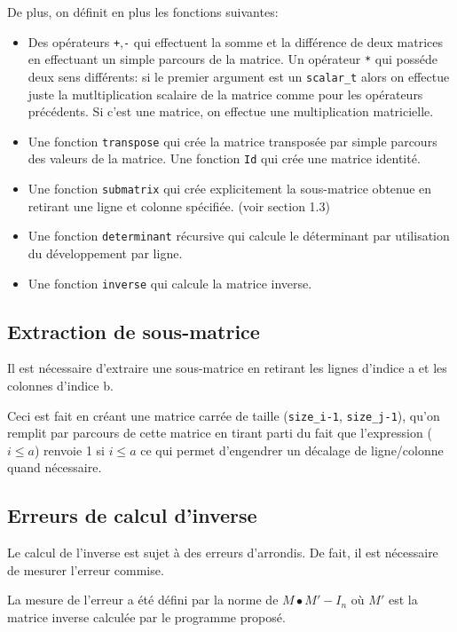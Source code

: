 \documentclass[a4paper,11pt]{article}
\begin{document}
De plus, on définit en plus les fonctions suivantes:

\begin{itemize}
\item Des opérateurs \texttt{+},\texttt{-} qui effectuent la somme et la différence de deux matrices en effectuant un simple parcours de la matrice. Un opérateur \texttt{*} qui posséde deux sens différents: si le premier argument est un \texttt{scalar\_t} alors on effectue juste la mutltiplication scalaire de la matrice comme pour les opérateurs précédents. Si c'est une matrice, on effectue une multiplication matricielle.
\item Une fonction \texttt{transpose} qui crée la matrice transposée par simple parcours des valeurs de la matrice. Une fonction \texttt{Id} qui crée une matrice identité.
\item Une fonction \texttt{submatrix} qui crée explicitement la sous-matrice obtenue en retirant une ligne et colonne spécifiée. (voir section 1.3)
\item Une fonction \texttt{determinant} récursive qui calcule le déterminant par utilisation du développement par ligne.
\item Une fonction \texttt{inverse} qui calcule la matrice inverse.
\end{itemize}

\subsection{Extraction de sous-matrice}

Il est nécessaire d'extraire une sous-matrice en retirant les lignes d'indice a et les colonnes d'indice b. 

Ceci est fait en créant une matrice carrée de taille (\texttt{size\_i-1}, \texttt{size\_j-1}), qu'on remplit par parcours de cette matrice en tirant parti du fait que l'expression
($i \leq a$) renvoie 1 si $i \leq a$ ce qui permet d'engendrer un décalage de ligne/colonne quand nécessaire.

\subsection{Erreurs de calcul d'inverse}

Le calcul de l'inverse est sujet à des erreurs d'arrondis. De fait, il est nécessaire de mesurer l'erreur commise.

La mesure de l'erreur a été défini par la norme de $M\bullet M' - I_n$ où $M'$ est la matrice inverse calculée par le programme proposé.
\end{document}

